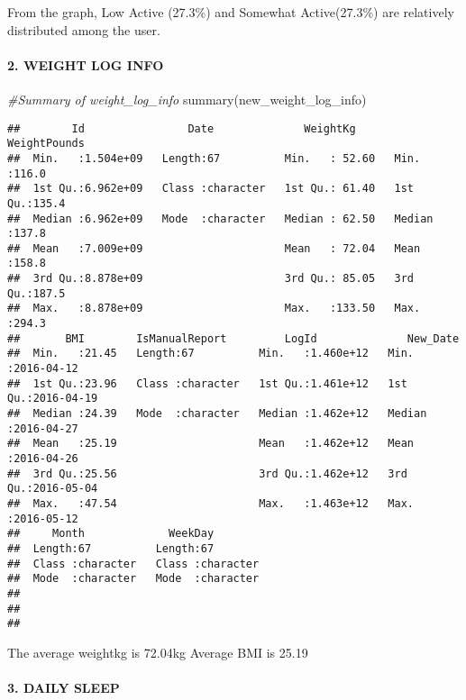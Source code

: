 \documentclass[
]{article}
\newenvironment{Shaded}{\begin{snugshade}}{\end{snugshade}}
\newcommand{\CommentTok}[1]{\textcolor[rgb]{0.56,0.35,0.01}{\textit{#1}}}
\newcommand{\FunctionTok}[1]{\textcolor[rgb]{0.00,0.00,0.00}{#1}}
\newcommand{\NormalTok}[1]{#1}
\begin{document}
From the graph, Low Active (27.3\%) and Somewhat Active(27.3\%) are
relatively distributed among the user.

\hypertarget{weight-log-info}{%
\paragraph{2. WEIGHT LOG INFO}\label{weight-log-info}}

\begin{Shaded}
\begin{Highlighting}[]
\CommentTok{\#Summary of weight\_log\_info}
\FunctionTok{summary}\NormalTok{(new\_weight\_log\_info)}
\end{Highlighting}
\end{Shaded}

\begin{verbatim}
##        Id                Date              WeightKg       WeightPounds  
##  Min.   :1.504e+09   Length:67          Min.   : 52.60   Min.   :116.0  
##  1st Qu.:6.962e+09   Class :character   1st Qu.: 61.40   1st Qu.:135.4  
##  Median :6.962e+09   Mode  :character   Median : 62.50   Median :137.8  
##  Mean   :7.009e+09                      Mean   : 72.04   Mean   :158.8  
##  3rd Qu.:8.878e+09                      3rd Qu.: 85.05   3rd Qu.:187.5  
##  Max.   :8.878e+09                      Max.   :133.50   Max.   :294.3  
##       BMI        IsManualReport         LogId              New_Date         
##  Min.   :21.45   Length:67          Min.   :1.460e+12   Min.   :2016-04-12  
##  1st Qu.:23.96   Class :character   1st Qu.:1.461e+12   1st Qu.:2016-04-19  
##  Median :24.39   Mode  :character   Median :1.462e+12   Median :2016-04-27  
##  Mean   :25.19                      Mean   :1.462e+12   Mean   :2016-04-26  
##  3rd Qu.:25.56                      3rd Qu.:1.462e+12   3rd Qu.:2016-05-04  
##  Max.   :47.54                      Max.   :1.463e+12   Max.   :2016-05-12  
##     Month             WeekDay         
##  Length:67          Length:67         
##  Class :character   Class :character  
##  Mode  :character   Mode  :character  
##                                       
##                                       
## 
\end{verbatim}

The average weightkg is 72.04kg Average BMI is 25.19

\hypertarget{daily-sleep}{%
\paragraph{3. DAILY SLEEP}\label{daily-sleep}}
\end{document}
